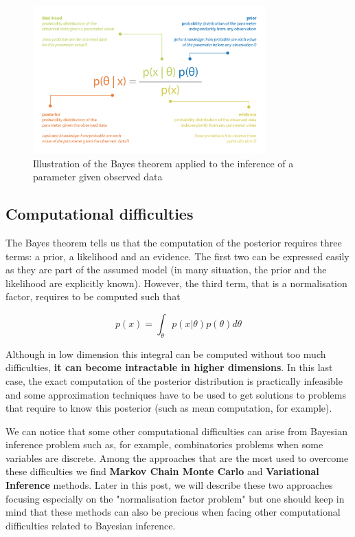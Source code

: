 \begin{figure}[h]
    \centering
\includegraphics[width=0.8\textwidth]{pic/p05c08-snip01.png}
    \caption{Illustration of the Bayes theorem applied to the inference of a parameter given observed data}
    \label{fig:p05c08-snip01}
\end{figure}


\subsection{Computational difficulties}

The Bayes theorem tells us that the computation of the posterior requires three terms: a prior, a likelihood and an evidence. The first two can be expressed easily as they are part of the assumed model (in many situation, the prior and the likelihood are explicitly known). However, the third term, that is a normalisation factor, requires to be computed such that

\begin{equation}p(x)=\int_{\theta} p(x | \theta) p(\theta) d \theta\end{equation}

Although in low dimension this integral can be computed without too much difficulties, \textbf{it can become intractable in higher dimensions}. In this last case, the exact computation of the posterior distribution is practically infeasible and some approximation techniques have to be used to get solutions to problems that require to know this posterior (such as mean computation, for example).

We can notice that some other computational difficulties can arise from Bayesian inference problem such as, for example, combinatorics problems when some variables are discrete. Among the approaches that are the most used to overcome these difficulties we find \textbf{Markov Chain Monte Carlo} and \textbf{Variational Inference} methods. Later in this post, we will describe these two approaches focusing especially on the "normalisation factor problem" but one should keep in mind that these methods can also be precious when facing other computational difficulties related to Bayesian inference.

